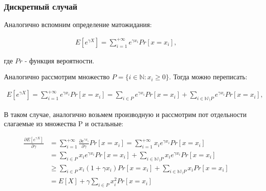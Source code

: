 \documentclass[12pt, a4paper]{article}
\newcounter{casenum}
\newcommand{\case}[2]{\vskip.5\baselineskip\par\noindent {\bfseries Случай \arabic{casenum}:} #1\\#2\addtocounter{casenum}{1}}
\theoremstyle{remark}
\newcommand{\der}[2]{\frac{\partial #1}{\partial #2}}
\begin{document}





\subsubsection*{Дискретный случай}

Аналогично вспомним определение матожидания:

\begin{align*}
    E[e^{\gamma X}] = \sum_{i = 1}^{+\infty} e^{\gamma x_i} Pr[x = x_i],
\end{align*}

где $Pr$ - функция вероятности.

\hfill

Аналогично рассмотрим множество $P = \{i \in \mathbb{N}: x_i \geq 0\}$. Тогда можно переписать: 

\begin{align*}
    E[e^{\gamma X}] = \sum_{i = 1}^{+\infty} e^{\gamma x_i} Pr[x = x_i] = \sum_{i \in P} e^{\gamma x_i} Pr[x = x_i] + \sum_{i \in \mathbb{N}\setminus P} e^{\gamma x_i} Pr[x = x_i],
\end{align*}

В таком случае, аналогично возьмем производную и рассмотрим пот отдельности слагаемые из множества P и остальные:

\begin{align*}
    \der{E[e^{\gamma X}]}{\gamma} &= \sum_{i = 1}^{+\infty} \frac{\partial e^{\gamma x_i}}{\partial \gamma} Pr[x = x_i] = \sum_{i = 1}^{+\infty} x_i e^{\gamma x_i} Pr[x = x_i] \\
    &= \sum_{i \in P} x_i e^{\gamma x_i} Pr[x = x_i] + \sum_{i \in \mathbb{N}\setminus P} x_i e^{\gamma x_i} Pr[x = x_i] \\
    &\geq \sum_{i \in P} x_i (1 + {\gamma x_i}) Pr[x = x_i] + \sum_{i \in \mathbb{N}\setminus P} x_i Pr[x = x_i] \\
    &= E[X] + \gamma\sum_{i \in P} x_i^2 Pr[x = x_i]
\end{align*}
\end{document}
